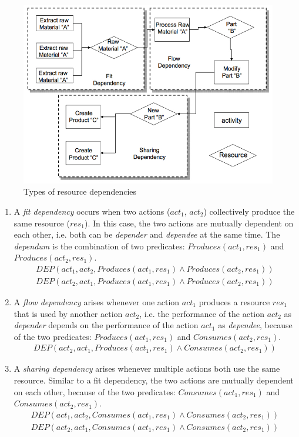 \begin{figure}[htbp] %
   \centering
   \includegraphics[width=4.5in]{resource_deps.jpg} 
   \caption{Types of resource dependencies \cite{malone1994interdisciplinary}}
   \label{fig:resource_deps}
\end{figure}

\begin{enumerate}
	\item A \emph{fit dependency} occurs when two actions ($act_1$, $act_2$) collectively produce the same resource ($res_1$). In this case, the two actions  are mutually dependent on each other, i.e. both can be \emph{depender} and \emph{dependee} at the same time. The \emph{dependum} is the combination of two predicates: $Produces(act_1, res_1)$ and $Produces(act_2, res_1)$.
		\begin{align*} 
			 DEP(act_1, act_2, Produces(act_1, res_1) \land Produces(act_2, res_1))\\
			 DEP(act_2, act_1, Produces(act_1, res_1) \land Produces(act_2, res_1))
		\end{align*}
	\item A \emph{flow dependency} arises whenever one action $act_1$ produces a resource $res_1$ that is used by another action $act_2$, i.e. the performance of the action $act_2$ as \emph{depender} depends on the performance of the action $act_1$ as \emph{dependee}, because of the two predicates: $Produces(act_1, res_1)$ and $Consumes(act_2, res_1)$.
		\begin{align*} 
			 DEP(act_2, act_1, Produces(act_1, res_1) \land Consumes(act_2, res_1))
		\end{align*}
	\item A \emph{sharing dependency} arises whenever multiple actions both use the same resource. Similar to a fit dependency, the two actions are mutually dependent on each other, because of the two predicates: $Consumes(act_1, res_1)$ and $Consumes(act_2, res_1)$.
	\begin{align*} 
		 DEP(act_1, act_2, Consumes(act_1, res_1) \land Consumes(act_2, res_1))\\
		 DEP(act_2, act_1, Consumes(act_1, res_1) \land Consumes(act_2, res_1))
	\end{align*}
\end{enumerate}

